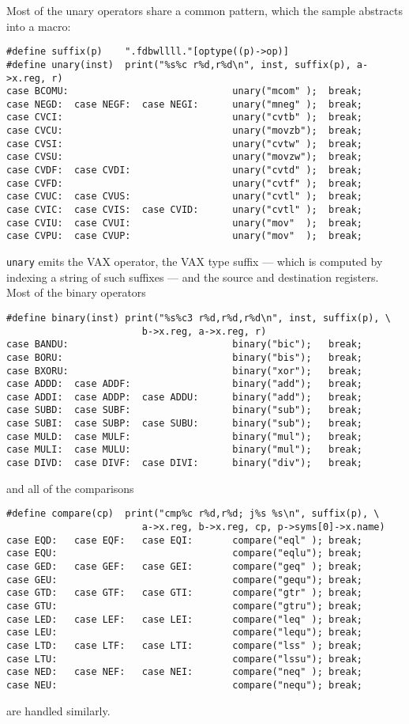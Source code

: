 Most of the unary operators share a common pattern, which the sample
abstracts into a macro:
\begin{verbatim}
#define suffix(p)    ".fdbwllll."[optype((p)->op)]
#define unary(inst)  print("%s%c r%d,r%d\n", inst, suffix(p), a->x.reg, r)
case BCOMU:                             unary("mcom" );  break;
case NEGD:  case NEGF:  case NEGI:      unary("mneg" );  break;
case CVCI:                              unary("cvtb" );  break;
case CVCU:                              unary("movzb");  break;
case CVSI:                              unary("cvtw" );  break;
case CVSU:                              unary("movzw");  break;
case CVDF:  case CVDI:                  unary("cvtd" );  break;
case CVFD:                              unary("cvtf" );  break;
case CVUC:  case CVUS:                  unary("cvtl" );  break;
case CVIC:  case CVIS:  case CVID:      unary("cvtl" );  break;
case CVIU:  case CVUI:                  unary("mov"  );  break;
case CVPU:  case CVUP:                  unary("mov"  );  break;
\end{verbatim}
\verb|unary| emits the VAX operator, the VAX type suffix --- which is
computed by indexing a string of such suffixes --- and the source and
destination registers. Most of the binary operators
\begin{verbatim}
#define binary(inst) print("%s%c3 r%d,r%d,r%d\n", inst, suffix(p), \
                        b->x.reg, a->x.reg, r)
case BANDU:                             binary("bic");   break;
case BORU:                              binary("bis");   break;
case BXORU:                             binary("xor");   break;
case ADDD:  case ADDF:                  binary("add");   break;
case ADDI:  case ADDP:  case ADDU:      binary("add");   break;
case SUBD:  case SUBF:                  binary("sub");   break;
case SUBI:  case SUBP:  case SUBU:      binary("sub");   break;
case MULD:  case MULF:                  binary("mul");   break;
case MULI:  case MULU:                  binary("mul");   break;
case DIVD:  case DIVF:  case DIVI:      binary("div");   break;
\end{verbatim}
and all of the comparisons
\begin{verbatim}
#define compare(cp)  print("cmp%c r%d,r%d; j%s %s\n", suffix(p), \
                        a->x.reg, b->x.reg, cp, p->syms[0]->x.name)
case EQD:   case EQF:   case EQI:       compare("eql" ); break;
case EQU:                               compare("eqlu"); break;
case GED:   case GEF:   case GEI:       compare("geq" ); break;
case GEU:                               compare("gequ"); break;
case GTD:   case GTF:   case GTI:       compare("gtr" ); break;
case GTU:                               compare("gtru"); break;
case LED:   case LEF:   case LEI:       compare("leq" ); break;
case LEU:                               compare("lequ"); break;
case LTD:   case LTF:   case LTI:       compare("lss" ); break;
case LTU:                               compare("lssu"); break;
case NED:   case NEF:   case NEI:       compare("neq" ); break;
case NEU:                               compare("nequ"); break;
\end{verbatim}
are handled similarly.

